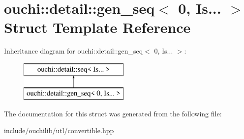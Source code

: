 \hypertarget{structouchi_1_1detail_1_1gen__seq_3_010_00_01_is_8_8_8_01_4}{}\section{ouchi\+::detail\+::gen\+\_\+seq$<$ 0, Is... $>$ Struct Template Reference}
\label{structouchi_1_1detail_1_1gen__seq_3_010_00_01_is_8_8_8_01_4}
Inheritance diagram for ouchi\+::detail\+::gen\+\_\+seq$<$ 0, Is... $>$\+:\begin{figure}[H]
\begin{center}
\leavevmode
\includegraphics[height=2.000000cm]{structouchi_1_1detail_1_1gen__seq_3_010_00_01_is_8_8_8_01_4}
\end{center}
\end{figure}


The documentation for this struct was generated from the following file\+:\begin{DoxyCompactItemize}
\item 
include/ouchilib/utl/convertible.\+hpp\end{DoxyCompactItemize}
